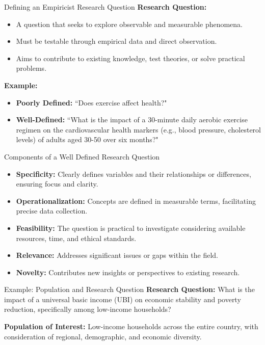 \documentclass[handout]{beamer} %
\begin{document}

\begin{frame}{Defining an Empiricist Research Question} 
\textbf{Research Question:}
\begin{itemize} 
    \item A question that seeks to explore observable and measurable phenomena.
    \item Must be testable through empirical data and direct observation.
    \item Aims to contribute to existing knowledge, test theories, or solve practical problems.
\end{itemize}
    \pause %
\textbf{Example:}
\begin{itemize}
    \item \textbf{Poorly Defined:} ``Does exercise affect health?"
    \item \textbf{Well-Defined:} ``What is the impact of a 30-minute daily aerobic exercise regimen on the cardiovascular health markers (e.g., blood pressure, cholesterol levels) of adults aged 30-50 over six months?"
\end{itemize}

\end{frame}

\begin{frame}{Components of a Well Defined Research Question} 
\begin{itemize}
    \item \textbf{Specificity:} Clearly defines variables and their relationships or differences, ensuring focus and clarity.
    \item \textbf{Operationalization:} Concepts are defined in measurable terms, facilitating precise data collection.
    \item \textbf{Feasibility:} The question is practical to investigate considering available resources, time, and ethical standards.
    \item \textbf{Relevance:} Addresses significant issues or gaps within the field.
    \item \textbf{Novelty:} Contributes new insights or perspectives to existing research.
\end{itemize}


\end{frame}




\begin{frame}{Example: Population and Research Question} 
\textcolor{moonstoneblue}{\textbf{Research Question:}} What is the impact of a universal basic income (UBI) on economic stability and poverty reduction, specifically among low-income households?

\vspace{0.5cm}

\textcolor{moonstoneblue}{\textbf{Population of Interest:}} Low-income households across the entire country, with consideration of regional, demographic, and economic diversity.

\end{frame}
\end{document}
